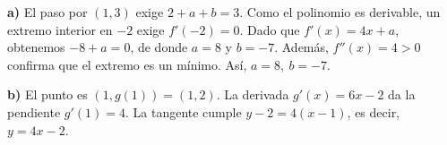 \textbf{a)} El paso por $(1,3)$ exige $2+a+b=3$. Como el polinomio es derivable, un extremo interior en $-2$ exige $f'(-2)=0$. Dado que $f'(x)=4x+a$, obtenemos $-8+a=0$, de donde $a=8$ y $b=-7$. Además, $f''(x)=4>0$ confirma que el extremo es un mínimo. Así, $\boxed{a=8,\ b=-7}$.

\textbf{b)} El punto es $(1,g(1))=(1,2)$. La derivada $g'(x)=6x-2$ da la pendiente $g'(1)=4$. La tangente cumple $y-2=4(x-1)$, es decir, $\boxed{y=4x-2}$.
